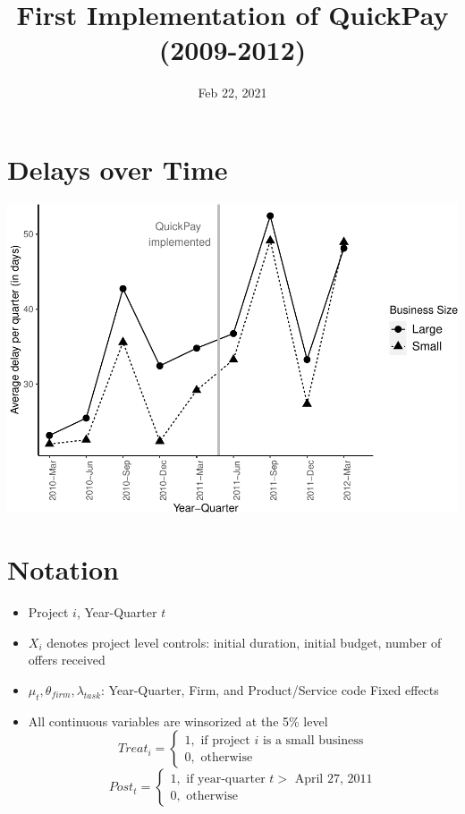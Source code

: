 \documentclass[
]{article}
\title{First Implementation of QuickPay (2009-2012)}
\author{}
\date{\vspace{-2.5em}Feb 22, 2021}
\providecommand{\tightlist}{%
  \setlength{\itemsep}{0pt}\setlength{\parskip}{0pt}}
\begin{document}
\maketitle

\hypertarget{delays-over-time}{%
\section{Delays over Time}\label{delays-over-time}}

\includegraphics{qp_first_implementation_files/figure-latex/plot-1.pdf}

\hypertarget{notation}{%
\section{Notation}\label{notation}}

\begin{itemize}
\tightlist
\item
  Project \(i\), Year-Quarter \(t\)
\item
  \(X_i\) denotes project level controls: initial duration, initial
  budget, number of offers received
\item
  \(\mu_t,\theta_{firm},\lambda_{task}\): Year-Quarter, Firm, and
  Product/Service code Fixed effects
\item
  All continuous variables are winsorized at the 5\% level
  \[ Treat_i = \begin{cases} 1, \text{ if project } i \text{ is a small business}\\
  0, \text{ otherwise} \end{cases}\]
  \[ Post_t = \begin{cases} 1, \text{ if year-quarter } t > \text{ April 27, 2011}\\
  0, \text{ otherwise} \end{cases}\]
\end{itemize}
\end{document}
